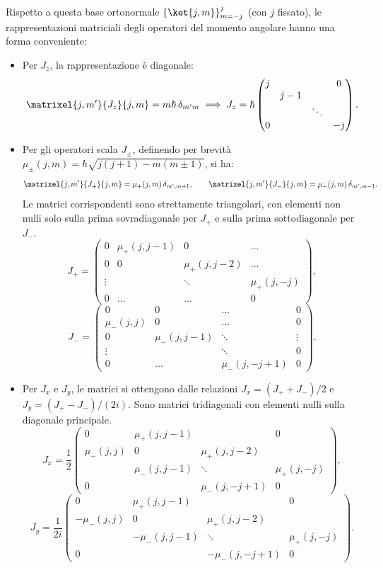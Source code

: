 Rispetto a questa base ortonormale \(\left\{ \ket{j,m} \right\}_{m=-j}^j\) (con \(j\) fissato), le rappresentazioni matriciali degli operatori del momento angolare hanno una forma conveniente:
\begin{itemize}
    \item Per \(J_z\), la rappresentazione è diagonale:
    \[
        \matrixel{j,m'}{J_z}{j,m} = m\hbar\,\delta_{m'm}
        \implies
        J_z = \hbar \begin{pmatrix} j & & & 0 \\ & j-1 & & \\ & & \ddots & \\ 0 & & & -j \end{pmatrix}.
    \]
    \item Per gli operatori scala \(J_\pm\), definendo per brevità $\mu_\pm(j,m) = \hbar \sqrt{j(j+1)-m(m\pm 1)}$, si ha:
    \[
        \matrixel{j,m'}{J_+}{j,m} = \mu_+(j,m)\,\delta_{m',m+1},
        \qquad
        \matrixel{j,m'}{J_-}{j,m} = \mu_-(j,m)\,\delta_{m',m-1}.
    \]
    Le matrici corrispondenti sono strettamente triangolari, con elementi non nulli solo sulla prima sovradiagonale per \(J_+\) e sulla prima sottodiagonale per \(J_-\).
    \[
        J_+ = \begin{pmatrix} 0 & \mu_+(j,j-1) & 0 & \dots \\ 0 & 0 & \mu_+(j,j-2) & \dots \\ \vdots & & \ddots & \mu_+(j,-j) \\ 0 & \dots & \dots & 0 \end{pmatrix},
    \]
    \[
        J_- = \begin{pmatrix} 0 & 0 & \dots & 0 \\ \mu_-(j,j) & 0 & \dots & 0 \\ 0 & \mu_-(j,j-1) & \ddots & \vdots \\ \vdots & & \ddots & 0 \\ 0 & \dots & \mu_-(j,-j+1) & 0 \end{pmatrix}.
    \]
    \item Per \(J_x\) e \(J_y\), le matrici si ottengono dalle relazioni \(J_x = (J_+ + J_-)/2\) e \(J_y = (J_+ - J_-)/(2i)\).
    Sono matrici tridiagonali con elementi nulli sulla diagonale principale.
    \[
        J_x = \frac{1}{2} \begin{pmatrix} 0 & \mu_+(j,j-1) & & 0 \\ \mu_-(j,j) & 0 & \mu_+(j,j-2) & \\ & \mu_-(j,j-1) & \ddots & \mu_+(j,-j) \\ 0 & & \mu_-(j,-j+1) & 0 \end{pmatrix},
    \]
    \[
        J_y = \frac{1}{2i} \begin{pmatrix} 0 & \mu_+(j,j-1) & & 0 \\ -\mu_-(j,j) & 0 & \mu_+(j,j-2) & \\ & -\mu_-(j,j-1) & \ddots & \mu_+(j,-j) \\ 0 & & -\mu_-(j,-j+1) & 0 \end{pmatrix}.
    \]
\end{itemize}


